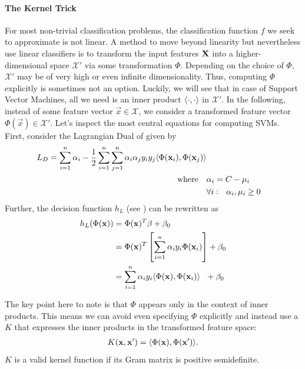 \documentclass[
	fontsize=10pt, %
	twoside=false, %
	secnumdepth=1, %
  toc=indentunnumbered %
]{kaobook}
\begin{document}
\paragraph{The Kernel Trick} For most non-trivial classification problems, the
classification function $f$ we seek to approximate is not linear. A method to
move beyond linearity but nevertheless use linear classifiers is to
transform the input features $\mathbf{X}$ into a higher-dimensional space
$\mathcal{X}'$ via some transformation $\Phi$. Depending on the choice of
$\Phi$, $\mathcal{X'}$ may be of very high or even infinite dimensionality.
Thus, computing $\Phi$ explicitly is sometimes not an option. Luckily, we will
see that in case of Support Vector Machines, all we need is an inner product
$\langle \cdot, \cdot \rangle$ in $\mathcal{X}'$. In the following, instead of some
feature vector $\vec x \in \mathcal{X}$, we consider a transformed feature
vector $\Phi(\vec x) \in \mathcal{X} '$.
%
Let's inspect the most central equations for computing SVMs. First, consider the
Lagrangian Dual of  given by
\begin{align*}
  L_D = \sum_{i=1}^n \alpha_i - \frac{1}{2} \sum_{i=1}^n \sum_{j=1}^n \alpha_i \alpha_j y_i y_j
  \langle \Phi(\mathbf{x}_i), \Phi(\mathbf{x}_j) \rangle \\
  \text{where~~~} & \alpha_i = C - \mu_i \\
  & \forall i:~~ \alpha_i, \mu_i \geq 0 \\
\end{align*}
Further, the decision function $h_L$ (see ) can be
rewritten as
\begin{align*}
  h_L(\Phi(\mathbf{x})) & = \Phi(\mathbf{x})^T \mathbf{\beta} + \beta_0 \\
              & = \Phi(\mathbf{x})^T \left[ \sum_{i=1}^n \alpha_i y_i \Phi(\mathbf{x}_i) \right] + \beta_0 \\
  &  = \sum_{i=1}^n \alpha_i y_i \langle \Phi(\mathbf{x}), \Phi(\mathbf{x}_i) \rangle ~~ + \beta_0
\end{align*}

The key point here to note is that $\Phi$ appears only in the context of inner
products. This means we can avoid even specifying $\Phi$ explicitly and instead
use a  $K$ that expresses the inner products in the
transformed feature space:
\begin{align*}
  K(\mathbf{x}, \mathbf{x}') = \langle \Phi(\mathbf{x}), \Phi(\mathbf{x}') \rangle.
\end{align*}
$K$ is a valid kernel function if its Gram matrix is positive semidefinite.
\end{document}
